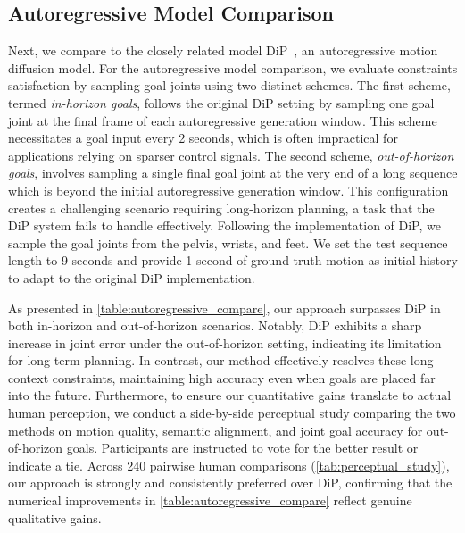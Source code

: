 \subsection{Autoregressive Model Comparison}
Next, we compare \method to the closely related model DiP~\cite{tevet2025closd}, an autoregressive motion diffusion model. 
For the autoregressive model comparison, we evaluate constraints satisfaction by sampling goal joints using two distinct schemes. The first scheme, termed \textit{in-horizon goals}, follows the original DiP setting by sampling one goal joint at the final frame of each autoregressive generation window. This scheme necessitates a goal input every 2 seconds, which is often impractical for applications relying on sparser control signals. The second scheme, \textit{out-of-horizon goals}, involves sampling a single final goal joint at the very end of a long sequence which is beyond the initial autoregressive generation window. This configuration creates a challenging scenario requiring long-horizon planning, a task that the DiP system fails to handle effectively. 
Following the implementation of DiP, we sample the goal joints from the pelvis, wrists, and feet. 
We set the test sequence length to 9 seconds and provide 1 second of ground truth motion as initial history to adapt to the original DiP implementation.

As presented in \cref{table:autoregressive_compare}, our approach surpasses DiP in both in-horizon and out-of-horizon scenarios. Notably, DiP exhibits a sharp increase in joint error under the out-of-horizon setting, indicating its limitation for long-term planning. In contrast, our method effectively resolves these long-context constraints, maintaining high accuracy even when goals are placed far into the future.
Furthermore, to ensure our quantitative gains translate to actual human perception, we conduct a side-by-side perceptual study comparing the two methods on motion quality, semantic alignment, and joint goal accuracy for out-of-horizon goals. Participants are instructed to vote for the better result or indicate a tie. Across 240 pairwise human comparisons (\cref{tab:perceptual_study}), our approach \method is strongly and consistently preferred over DiP, confirming that the numerical improvements in \cref{table:autoregressive_compare} reflect genuine qualitative gains.








